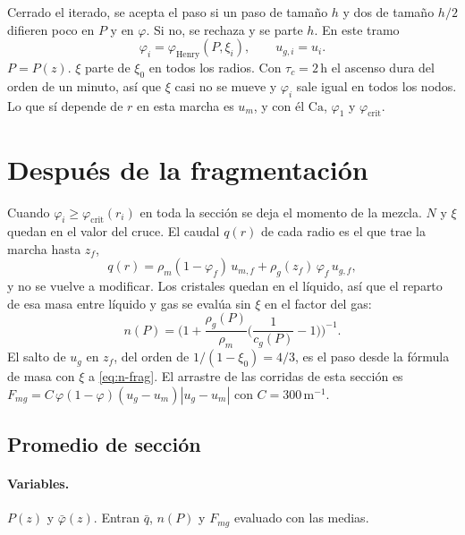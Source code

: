 \documentclass[11pt,a4paper]{article}
\begin{document}
Cerrado el iterado, se acepta el paso si un paso de tamaño $h$ y
dos de tamaño $h/2$ difieren poco en $P$ y en $\varphi$. Si no, se
rechaza y se parte $h$. En este tramo
\begin{equation}
\label{eq:cierre-pre}
\varphi_i=\varphi_{\mathrm{Henry}}(P,\xi_i),
\qquad
u_{g,i}=u_i.
\end{equation}
$P=P(z)$. $\xi$ parte de $\xi_0$ en todos los radios. Con
$\tau_c=2\,\mathrm{h}$ el ascenso dura del orden de un minuto, así
que $\xi$ casi no se mueve y $\varphi_i$ sale igual en todos los
nodos. Lo que sí depende de $r$ en esta marcha es $u_m$, y con él
$\mathrm{Ca}$, $\varphi_1$ y $\varphi_{\mathrm{crit}}$.

\section{Después de la fragmentación}
\label{sec:frag}

Cuando $\varphi_i\ge\varphi_{\mathrm{crit}}(r_i)$ en toda la
sección se deja el momento de la mezcla. $N$ y $\xi$ quedan en el
valor del cruce. El caudal $q(r)$ de cada radio es el que trae la
marcha hasta $z_f$,
\begin{equation}
\label{eq:q-f}
q(r)
=\rho_m(1-\varphi_f)\,u_{m,f}
+\rho_g(z_f)\,\varphi_f\,u_{g,f},
\end{equation}
y no se vuelve a modificar. Los cristales quedan en el líquido, así
que el reparto de esa masa entre líquido y gas se evalúa sin $\xi$
en el factor del gas:
\begin{equation}
\label{eq:n-frag}
n(P)
=\Biggl(1+\frac{\rho_g(P)}{\rho_m}\Biggl(\frac{1}{c_g(P)}-1\Biggr)\Biggr)^{-1}.
\end{equation}
El salto de $u_g$ en $z_f$, del orden de $1/(1-\xi_0)=4/3$, es el
paso desde la fórmula de masa con $\xi$ a \eqref{eq:n-frag}.
El arrastre de las corridas de esta sección es
$F_{mg}=C\,\varphi(1-\varphi)(u_g-u_m)|u_g-u_m|$ con
$C=300\,\mathrm{m}^{-1}$.

\subsection{Promedio de sección}

\paragraph{Variables.}
$P(z)$ y $\bar\varphi(z)$. Entran $\bar q$, $n(P)$ y $F_{mg}$
evaluado con las medias.
\end{document}
